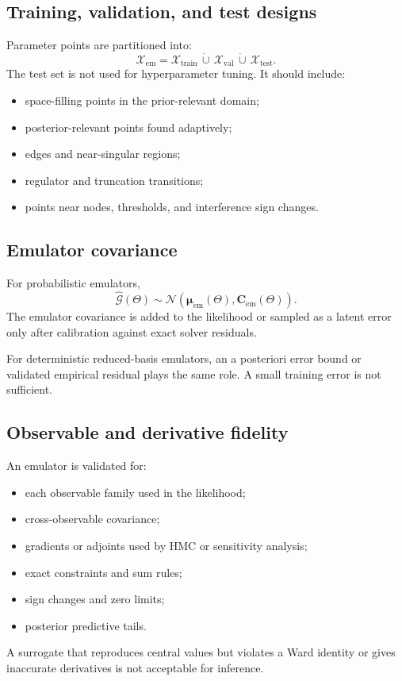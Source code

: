 \documentclass[11pt]{article}
\newcommand{\cG}{\mathcal G}
\newcommand{\cX}{\mathcal X}
\newcommand{\emul}{\mathrm{em}}
\begin{document}
\subsection{Training, validation, and test designs}

Parameter points are partitioned into:
\begin{equation}
 \cX_{\emul}
 =
 \cX_{\mathrm{train}}
 \,\dot\cup\,
 \cX_{\mathrm{val}}
 \,\dot\cup\,
 \cX_{\mathrm{test}}.
 \label{eq:emulator-split}
\end{equation}
The test set is not used for hyperparameter tuning.  It should include:
\begin{itemize}
\item space-filling points in the prior-relevant domain;
\item posterior-relevant points found adaptively;
\item edges and near-singular regions;
\item regulator and truncation transitions;
\item points near nodes, thresholds, and interference sign changes.
\end{itemize}

\subsection{Emulator covariance}

For probabilistic emulators,
\begin{equation}
 \widehat{\cG}(\Theta)
 \sim
 \mathcal N\!\left(
 \bm\mu_{\emul}(\Theta),
 \bm C_{\emul}(\Theta)
 \right).
 \label{eq:probabilistic-emulator}
\end{equation}
The emulator covariance is added to the likelihood or sampled as a latent
error only after calibration against exact solver residuals.

For deterministic reduced-basis emulators, an a posteriori error bound or
validated empirical residual plays the same role.  A small training error is
not sufficient.

\subsection{Observable and derivative fidelity}

An emulator is validated for:
\begin{itemize}
\item each observable family used in the likelihood;
\item cross-observable covariance;
\item gradients or adjoints used by HMC or sensitivity analysis;
\item exact constraints and sum rules;
\item sign changes and zero limits;
\item posterior predictive tails.
\end{itemize}
A surrogate that reproduces central values but violates a Ward identity or
gives inaccurate derivatives is not acceptable for inference.
\end{document}
